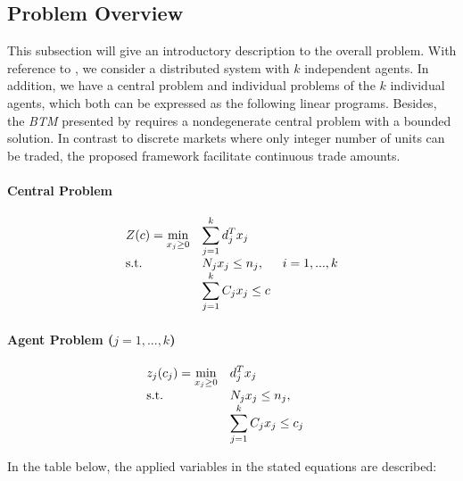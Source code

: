 \subsection{Problem Overview}
This subsection will give an introductory description to the overall problem. 
With reference to , we consider a distributed 
system with $k$ independent agents.
In addition, we have a central problem and individual 
problems of the $k$ individual agents, which both can be expressed as the following 
linear programs. Besides, the \textit{BTM} presented by  requires 
a nondegenerate central problem with a bounded solution. In contrast to discrete markets where 
only integer number of units can be traded, the proposed framework facilitate continuous 
trade amounts. 

\paragraph*{Central Problem}
\begin{equation}
    \begin{array}{ll@{}ll}
        Z(c) = \underset{x_{j} \geq 0}{\text{min}}  & \displaystyle\sum\limits_{j=1}^{k} d^{T}_{j}x_{j} &\\
        \text{s.t.}& \displaystyle N_{j}x_{j} \leq n_{j}, &&i=1 ,..., k  \\
                    & \displaystyle\sum\limits_{j=1}^{k} C_{j}x_{j} \leq c
    \end{array}
\end{equation}

\paragraph*{Agent Problem ($j=1, ..., k$)}
\begin{equation}
    \begin{array}{ll@{}ll}
        z_{j}(c_{j}) =  \underset{x_{j} \geq 0}{\text{min}}  & \displaystyle d^{T}_{j}x_{j} &\\
        \text{s.t.}& \displaystyle N_{j}x_{j} \leq n_{j}, &&\\
                    & \displaystyle\sum\limits_{j=1}^{k} C_{j}x_{j} \leq c_{j}
    \end{array}
\end{equation}

In the table below, the applied variables in the stated equations are described:


